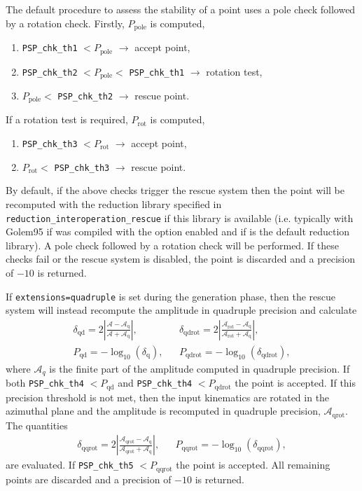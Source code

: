 The default procedure to assess the stability of a point uses a pole check followed by a rotation check.
Firstly, $P_\mathrm{pole}$ is computed,
\begin{enumerate}
\item \texttt{PSP\_chk\_th1} $< P_\mathrm{pole}$ $\rightarrow$ accept point,
\item \texttt{PSP\_chk\_th2} $< P_\mathrm{pole} < $ \texttt{PSP\_chk\_th1} $\rightarrow$ rotation test,
\item $P_\mathrm{pole} <$ \texttt{PSP\_chk\_th2} $\rightarrow$ rescue point.
\end{enumerate}
If a rotation test is required, $P_\mathrm{rot}$ is computed,
\begin{enumerate}
\item \texttt{PSP\_chk\_th3} $< P_\mathrm{rot}$ $\rightarrow$ accept point,
\item  $P_\mathrm{rot} <$ \texttt{PSP\_chk\_th3} $\rightarrow$ rescue point.
\end{enumerate}

By default, if the above checks trigger the rescue system then the
point will be recomputed with the reduction library specified in
\texttt{reduction\_interoperation\_rescue} if this
library is available (i.e. typically with {\sc Golem95}  if \gosam was compiled with the \golem
option enabled and if \ninja is the default reduction library).
A pole check followed by a rotation check will be performed.
If these checks fail or the rescue system is disabled, the point is discarded and a precision of $-10$ is returned.

If \texttt{extensions=quadruple} is set during the \gosam generation phase, then the rescue system will instead recompute the amplitude in quadruple precision and calculate
\begin{align}
&\delta_\mathrm{qd} = 2 \left| \frac{\mathcal{A}-\mathcal{A}_\mathrm{q}}{\mathcal{A}+\mathcal{A}_\mathrm{q}} \right|,&
&\delta_\mathrm{qdrot} = 2 \left| \frac{\mathcal{A}_\mathrm{rot}-\mathcal{A}_\mathrm{q}}{\mathcal{A}_\mathrm{rot}+\mathcal{A}_\mathrm{q}} \right|, & \\
&P_\mathrm{qd} = -\log_\mathrm{10}(\delta_\mathrm{q}),&
&P_\mathrm{qdrot} = -\log_\mathrm{10}(\delta_\mathrm{qdrot}),&
\end{align}
where $\mathcal{A}_q$ is the finite part of the amplitude computed in quadruple precision.
If both \texttt{PSP\_chk\_th4} $< P_\mathrm{qd}$ and \texttt{PSP\_chk\_th4} $< P_\mathrm{qdrot}$ the point is accepted.
If this precision threshold is not met, then the input kinematics are rotated in the azimuthal plane and the amplitude is recomputed in quadruple precision, $\mathcal{A}_\mathrm{qrot}$.
The quantities
\begin{align}
&\delta_\mathrm{qqrot} = 2 \left| \frac{\mathcal{A}_\mathrm{qrot}-\mathcal{A}_\mathrm{q}}{\mathcal{A}_\mathrm{qrot}+\mathcal{A}_\mathrm{q}} \right|,&
&P_\mathrm{qqrot} = -\log_\mathrm{10}(\delta_\mathrm{qqrot}),&
\end{align}
are evaluated.
If \texttt{PSP\_chk\_th5} $< P_\mathrm{qqrot}$ the point is accepted. 
All remaining points are discarded and a precision of $-10$ is returned.

